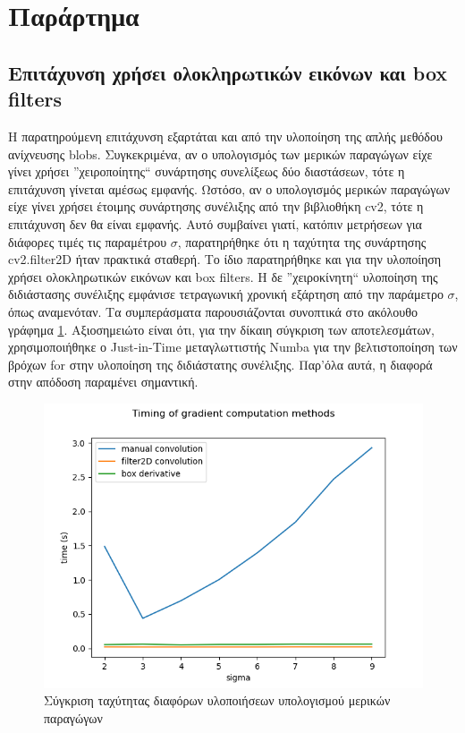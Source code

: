\documentclass{article}
\newcommand{\eng}[1]{\foreignlanguage{english}{#1}}
\begin{document}
\newpage
\section{Παράρτημα}
\subsection{Επιτάχυνση χρήσει ολοκληρωτικών εικόνων και \eng{box filters}}
\label{section:details}

Η παρατηρούμενη επιτάχυνση εξαρτάται και από την υλοποίηση της απλής μεθόδου ανίχνευσης \eng{blobs}. Συγκεκριμένα, αν ο υπολογισμός των μερικών παραγώγων είχε γίνει χρήσει ''χειροποίητης`` συνάρτησης συνελίξεως δύο διαστάσεων, τότε η επιτάχυνση γίνεται αμέσως εμφανής. Ωστόσο, αν ο υπολογισμός μερικών παραγώγων είχε γίνει χρήσει έτοιμης συνάρτησης συνέλιξης από την βιβλιοθήκη \eng{cv2}, τότε η επιτάχυνση δεν θα είναι εμφανής. Αυτό συμβαίνει γιατί, κατόπιν μετρήσεων για διάφορες τιμές τις παραμέτρου $\sigma$, παρατηρήθηκε ότι η ταχύτητα της συνάρτησης  \eng{cv2.filter2D} ήταν πρακτικά σταθερή. Το ίδιο παρατηρήθηκε και για την υλοποίηση χρήσει ολοκληρωτικών εικόνων και \eng{box filters}. Η δε ''χειροκίνητη`` υλοποίηση της διδιάστασης συνέλιξης εμφάνισε τετραγωνική χρονική εξάρτηση από την παράμετρο $\sigma$, όπως αναμενόταν. Τα συμπεράσματα παρουσιάζονται συνοπτικά στο ακόλουθο γράφημα \ref{fig:grad-comparison}. Αξιοσημειώτο είναι ότι, για την δίκαιη σύγκριση των αποτελεσμάτων, χρησιμοποιήθηκε ο \eng{Just-in-Time} μεταγλωττιστής \eng{Numba} για την βελτιστοποίηση των βρόχων \eng{for} στην υλοποίηση της διδιάστατης συνέλιξης. Παρ'όλα αυτά, η διαφορά στην απόδοση παραμένει σημαντική.

\begin{figure}[h]
    \centering
    \includegraphics[width=\textwidth]{../image-plots/grad-comparison.png}
    \caption{Σύγκριση ταχύτητας διαφόρων υλοποιήσεων υπολογισμού μερικών παραγώγων}
    \label{fig:grad-comparison}
\end{figure}
\FloatBarrier
\end{document}
